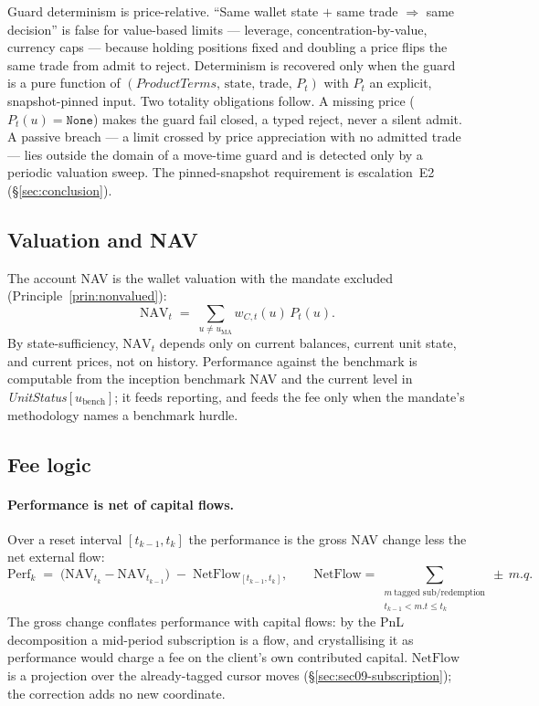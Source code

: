 Guard determinism is price-relative. ``Same wallet state $+$ same trade $\Rightarrow$ same
decision'' is false for value-based limits --- leverage, concentration-by-value, currency caps ---
because holding positions fixed and doubling a price flips the same trade from admit to reject.
Determinism is recovered only when the guard is a pure function of
$(\textit{ProductTerms},\,\text{state},\,\text{trade},\,P_t)$ with $P_t$ an explicit,
snapshot-pinned input. Two totality obligations follow. A missing price ($P_t(u)=\texttt{None}$)
makes the guard fail closed, a typed reject, never a silent admit. A passive breach --- a limit
crossed by price appreciation with no admitted trade --- lies outside the domain of a move-time
guard and is detected only by a periodic valuation sweep. The pinned-snapshot requirement is
escalation~E2 (\S\ref{sec:conclusion}).

\subsection{Valuation and NAV}
\label{sec:sec09-nav}

The account NAV is the wallet valuation with the mandate excluded
(Principle~\ref{prin:nonvalued}):
\[
\mathrm{NAV}_t \;=\; \sum_{u\neq u_{\mathrm{MA}}} w_{C,t}(u)\,P_t(u).
\]
By state-sufficiency, $\mathrm{NAV}_t$ depends only on current balances, current unit state, and
current prices, not on history. Performance against the benchmark is computable from the inception
benchmark NAV and the current level in \textit{UnitStatus}$[u_{\mathrm{bench}}]$; it feeds
reporting, and feeds the fee only when the mandate's methodology names a benchmark hurdle.

\subsection{Fee logic}
\label{sec:sec09-fees}

\paragraph{Performance is net of capital flows.} Over a reset interval $[t_{k-1},t_k]$ the
performance is the gross NAV change less the net external flow:
\[
\mathrm{Perf}_k \;=\; \big(\mathrm{NAV}_{t_k}-\mathrm{NAV}_{t_{k-1}}\big)\;-\;
\mathrm{NetFlow}_{[t_{k-1},t_k]},\qquad
\mathrm{NetFlow}=\!\!\sum_{\substack{m\ \text{tagged sub/redemption}\\ t_{k-1}<m.t\le t_k}}\!\!\pm\,m.q.
\]
The gross change conflates performance with capital flows: by the PnL decomposition a mid-period
subscription is a flow, and crystallising it as performance would charge a fee on the client's own
contributed capital. $\mathrm{NetFlow}$ is a projection over the already-tagged cursor moves
(\S\ref{sec:sec09-subscription}); the correction adds no new coordinate.


